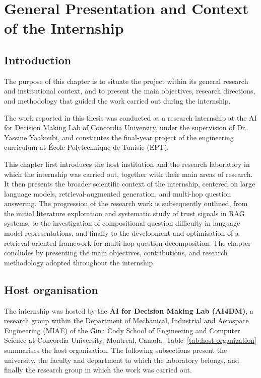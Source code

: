 \chapter{General Presentation and Context of the Internship}
\label{chap:presentation}

\section*{Introduction}
{}

The purpose of this chapter is to situate the project within its general research and institutional context, 
and to present the main objectives, research directions, and methodology that guided the work carried out during the internship.

The work reported in this thesis was conducted as a research internship at the AI for Decision Making Lab of Concordia University, 
under the supervision of Dr. Yassine Yaakoubi, and constitutes the final-year project of the engineering curriculum at 
École Polytechnique de Tunisie (EPT).


This chapter first introduces the host institution and the research laboratory in which the internship was carried out, 
together with their main areas of research. It then presents the broader scientific context of the internship, 
centered on large language models, retrieval-augmented generation, and multi-hop question answering. 
The progression of the research work is subsequently outlined, from the initial literature exploration and systematic study of 
trust signals in RAG systems, to the investigation of compositional question difficulty in language model representations,
and finally to the development and optimisation of a retrieval-oriented framework for multi-hop question decomposition. 
The chapter concludes by presenting the main objectives, contributions, and research methodology adopted throughout the internship.

\section{Host organisation}
\label{sec:ch1-host-organization}

The internship was hosted by the \textbf{AI for Decision Making Lab (AI4DM)}, a research group within 
the Department of Mechanical, Industrial and Aerospace Engineering (MIAE) of the Gina Cody School of 
Engineering and Computer Science at Concordia University, Montreal, Canada. Table~\ref{tab:host-organization} summarises the host organisation. 
The following subsections present the university, the faculty and department to which the laboratory belongs, 
and finally the research group in which the work was carried out.

